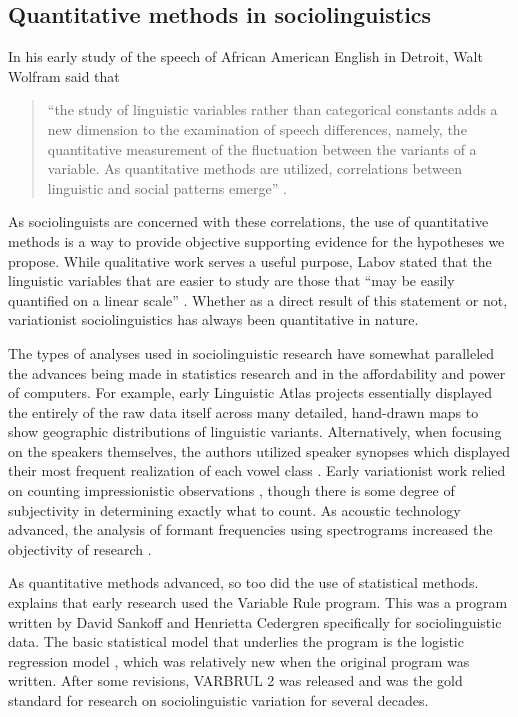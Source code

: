 \subsection{Quantitative methods in sociolinguistics}
\label{quantitative_methods_sociolinguistics}

In his early study of the speech of African American English in Detroit, Walt Wolfram said that
\begin{quote}
    ``the study of linguistic variables rather than categorical constants adds a new dimension to the examination of speech differences, namely, the quantitative measurement of the fluctuation between the variants of a variable. As quantitative methods are utilized, correlations between linguistic and social patterns emerge'' \citep[47]{wolfram_1969}.
\end{quote}
As sociolinguists are concerned with these correlations, the use of quantitative methods is a way to provide objective supporting evidence for the hypotheses we propose. While qualitative work serves a useful purpose, Labov stated that the linguistic variables that are easier to study are those that ``may be easily quantified on a linear scale'' \citeyearpar[32]{labov_2006}. Whether as a direct result of this statement or not, variationist sociolinguistics has always been quantitative in nature.

The types of analyses used in sociolinguistic research have somewhat paralleled the advances being made in statistics research and in the affordability and power of computers. For example, early Linguistic Atlas projects \citep{kurath_1939_lane} essentially displayed the entirely of the raw data itself across many detailed, hand-drawn maps to show geographic distributions of linguistic variants. Alternatively, when focusing on the speakers themselves, the authors utilized speaker synopses which displayed their most frequent realization of each vowel class \citep{kurath_mcdavid_1961}. Early variationist work relied on counting  impressionistic observations \citep{labov_2006, wolfram_1969}, though there is some degree of subjectivity in determining exactly what to count. As acoustic technology advanced, the analysis of formant frequencies using spectrograms increased the objectivity of research \citep{peterson_barney_1952, labov_1972_LYS}.

As quantitative methods advanced, so too did the use of statistical methods. \citet[107--116]{tagliamonte_2016}  explains that early research used the Variable Rule program. This was a program written by David Sankoff and Henrietta Cedergren specifically for sociolinguistic data. The basic statistical model that underlies the program is the logistic regression model \citep{cox_1958}, which was relatively new when the original program was written. After some revisions, VARBRUL 2 \citep{sankoff_1975_varbrul} was released  and was the gold standard for research on sociolinguistic variation for several decades.

